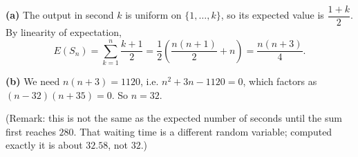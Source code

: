 \textbf{(a)} The output in second $k$ is uniform on $\{1,\dots,k\}$, so its expected value is $\dfrac{1+k}{2}$. By linearity of expectation,
\[E(S_n)=\sum_{k=1}^{n}\dfrac{k+1}{2}=\dfrac12\left(\dfrac{n(n+1)}{2}+n\right)=\boxed{\dfrac{n(n+3)}{4}}.\]

\textbf{(b)} We need $n(n+3)=1120$, i.e. $n^2+3n-1120=0$, which factors as $(n-32)(n+35)=0$. So $\boxed{n=32}$.

(Remark: this is not the same as the expected number of seconds until the sum first reaches $280$. That waiting time is a different random variable; computed exactly it is about $32.58$, not $32$.)
